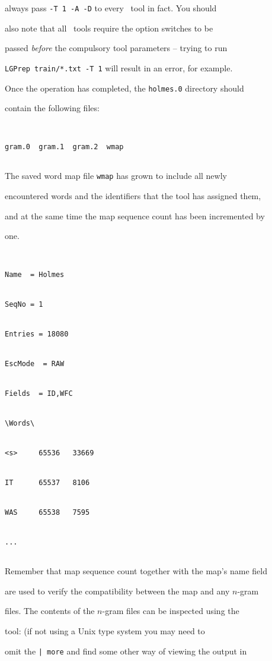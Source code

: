 always pass {\tt -T 1 -A -D} to every \HTK\ tool in fact.  You should


also note that all \HTK\ tools require the option switches to be


passed {\it before} the compulsory tool parameters -- trying to run


{\tt LGPrep train/*.txt -T 1} will result in an error, for example.





Once the operation has completed, the \texttt{holmes.0} directory should


contain the following files:


\begin{verbatim}


gram.0  gram.1  gram.2  wmap


\end{verbatim}


The saved word map file \texttt{wmap} has grown to include all newly


encountered words and the identifiers that the tool has assigned them,


and at the same time the map sequence count has been incremented by


one.


\begin{verbatim}


Name  = Holmes


SeqNo = 1


Entries = 18080


EscMode  = RAW


Fields  = ID,WFC


\Words\


<s>     65536   33669


IT      65537   8106


WAS     65538   7595


...


\end{verbatim}


Remember that map sequence count together with the map's name field


are used to verify the compatibility between the map and any $n$-gram


files.  The contents of the $n$-gram files can be inspected using the


 tool:  (if not using a Unix type system you may need to


omit the {\tt | more} and find some other way of viewing the output in



